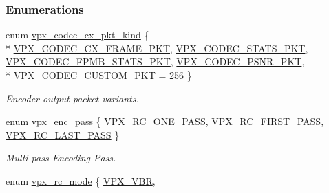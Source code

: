 \subsubsection*{Enumerations}
\begin{DoxyCompactItemize}
\item 
enum \hyperlink{group__encoder_ga28a79375279536526552af3a83d2ed72}{vpx\+\_\+codec\+\_\+cx\+\_\+pkt\+\_\+kind} \{ \\*
\hyperlink{group__encoder_gga28a79375279536526552af3a83d2ed72a2261aae5594289400e812fb1e6b6b0cc}{V\+P\+X\+\_\+\+C\+O\+D\+E\+C\+\_\+\+C\+X\+\_\+\+F\+R\+A\+M\+E\+\_\+\+P\+KT}, 
\hyperlink{group__encoder_gga28a79375279536526552af3a83d2ed72a77cd8b95d9891bcce36117f5f31994fd}{V\+P\+X\+\_\+\+C\+O\+D\+E\+C\+\_\+\+S\+T\+A\+T\+S\+\_\+\+P\+KT}, 
\hyperlink{group__encoder_gga28a79375279536526552af3a83d2ed72a9953278e8a3abc9764981352b1c36d9d}{V\+P\+X\+\_\+\+C\+O\+D\+E\+C\+\_\+\+F\+P\+M\+B\+\_\+\+S\+T\+A\+T\+S\+\_\+\+P\+KT}, 
\hyperlink{group__encoder_gga28a79375279536526552af3a83d2ed72a11eefa1328e6d22eb7c844645a260628}{V\+P\+X\+\_\+\+C\+O\+D\+E\+C\+\_\+\+P\+S\+N\+R\+\_\+\+P\+KT}, 
\\*
\hyperlink{group__encoder_gga28a79375279536526552af3a83d2ed72a7b54c122969397b1926de853d28b3c80}{V\+P\+X\+\_\+\+C\+O\+D\+E\+C\+\_\+\+C\+U\+S\+T\+O\+M\+\_\+\+P\+KT} = 256
 \}\begin{DoxyCompactList}\small\item\em Encoder output packet variants. \end{DoxyCompactList}
\item 
enum \hyperlink{group__encoder_ga476c5417f9c15a1dc5d3f68fa44c493f}{vpx\+\_\+enc\+\_\+pass} \{ \hyperlink{group__encoder_gga476c5417f9c15a1dc5d3f68fa44c493fa7b6943a41868e8e26a77e9500f139ca1}{V\+P\+X\+\_\+\+R\+C\+\_\+\+O\+N\+E\+\_\+\+P\+A\+SS}, 
\hyperlink{group__encoder_gga476c5417f9c15a1dc5d3f68fa44c493faa0765945345b160905f3b762986dae3b}{V\+P\+X\+\_\+\+R\+C\+\_\+\+F\+I\+R\+S\+T\+\_\+\+P\+A\+SS}, 
\hyperlink{group__encoder_gga476c5417f9c15a1dc5d3f68fa44c493fa65da543b956d6a9b1f301ab8cc90d3a7}{V\+P\+X\+\_\+\+R\+C\+\_\+\+L\+A\+S\+T\+\_\+\+P\+A\+SS}
 \}\begin{DoxyCompactList}\small\item\em Multi-\/pass Encoding Pass. \end{DoxyCompactList}
\item 
enum \hyperlink{group__encoder_gaf50e74d91be4cae6f70dfeba5b7410d2}{vpx\+\_\+rc\+\_\+mode} \{ \hyperlink{group__encoder_ggaf50e74d91be4cae6f70dfeba5b7410d2ab8fbe4441ed3f31a167c8194e8a64f87}{V\+P\+X\+\_\+\+V\+BR}, 

\end{DoxyCompactItemize}
